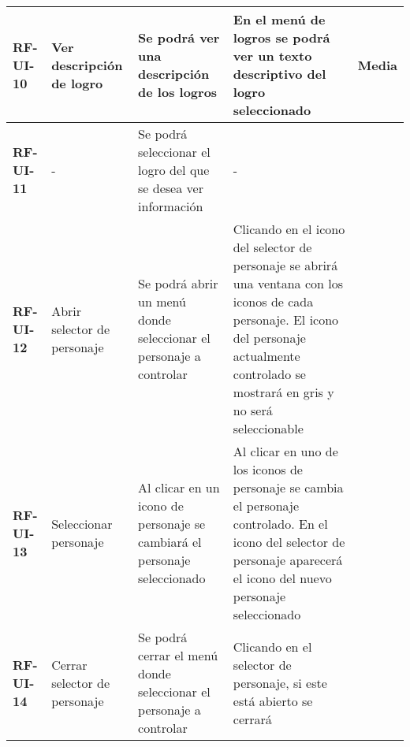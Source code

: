 \begin{table}[]
\begin{tabular}{lllll}
\multicolumn{1}{|l|}{\textbf{RF-UI-10}}      & \multicolumn{1}{l|}{Ver descripción de logro}      & \multicolumn{1}{l|}{Se podrá ver una descripción de los logros}                                        & \multicolumn{1}{l|}{En el menú de logros se podrá ver un texto descriptivo del logro seleccionado}                                                                                                                                                                    & \multicolumn{1}{l|}{Media}              \\ \hline
\multicolumn{1}{|l|}{\textbf{RF-UI-11}}      & \multicolumn{1}{l|}{-}                             & \multicolumn{1}{l|}{Se podrá seleccionar el logro del que se desea ver información}                    & \multicolumn{1}{l|}{-}                                                                                                                                                                                                                                                & \multicolumn{1}{l|}{}                   \\ \hline
\multicolumn{1}{|l|}{\textbf{RF-UI-12}}      & \multicolumn{1}{l|}{Abrir selector de personaje}   & \multicolumn{1}{l|}{Se podrá abrir un menú donde seleccionar el personaje a controlar}                 & \multicolumn{1}{l|}{Clicando en el icono del selector de personaje se abrirá una ventana con los iconos de cada personaje. El icono del personaje actualmente controlado se mostrará en gris y no será seleccionable}                                                 & \multicolumn{1}{l|}{}                   \\ \hline
\multicolumn{1}{|l|}{\textbf{RF-UI-13}}      & \multicolumn{1}{l|}{Seleccionar personaje}         & \multicolumn{1}{l|}{Al clicar en un icono de personaje se cambiará el personaje seleccionado}          & \multicolumn{1}{l|}{Al clicar en uno de los iconos de personaje se cambia el personaje controlado. En el icono del selector de personaje aparecerá el icono del nuevo personaje seleccionado}                                                                         & \multicolumn{1}{l|}{}                   \\ \hline
\multicolumn{1}{|l|}{\textbf{RF-UI-14}}      & \multicolumn{1}{l|}{Cerrar selector de personaje}  & \multicolumn{1}{l|}{Se podrá cerrar el menú donde seleccionar el personaje a controlar}                & \multicolumn{1}{l|}{Clicando en el selector de personaje, si este está abierto se cerrará}                                                                                                                                                                            & \multicolumn{1}{l|}{}                   \\ \hline

\end{tabular}
\end{table}
